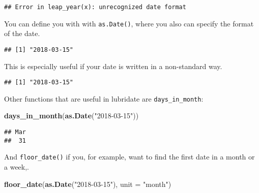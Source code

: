 \documentclass[]{book}
\newenvironment{Shaded}{\begin{snugshade}}{\end{snugshade}}
\newcommand{\DataTypeTok}[1]{\textcolor[rgb]{0.13,0.29,0.53}{#1}}
\newcommand{\KeywordTok}[1]{\textcolor[rgb]{0.13,0.29,0.53}{\textbf{#1}}}
\newcommand{\NormalTok}[1]{#1}
\newcommand{\StringTok}[1]{\textcolor[rgb]{0.31,0.60,0.02}{#1}}
\begin{document}
\begin{verbatim}
## Error in leap_year(x): unrecognized date format
\end{verbatim}

You can define you with with \texttt{as.Date()}, where you also can specify the format of the date.

\begin{Shaded}
\end{Shaded}

\begin{verbatim}
## [1] "2018-03-15"
\end{verbatim}

This is especially useful if your date is written in a non-standard way.

\begin{Shaded}
\end{Shaded}

\begin{verbatim}
## [1] "2018-03-15"
\end{verbatim}

Other functions that are useful in lubridate are \texttt{days\_in\_month}:

\begin{Shaded}
\begin{Highlighting}[]
\KeywordTok{days_in_month}\NormalTok{(}\KeywordTok{as.Date}\NormalTok{(}\StringTok{"2018-03-15"}\NormalTok{))}
\end{Highlighting}
\end{Shaded}

\begin{verbatim}
## Mar 
##  31
\end{verbatim}

And \texttt{floor\_date()} if you, for example, want to find the first date in a month or a week,.

\begin{Shaded}
\begin{Highlighting}[]
\KeywordTok{floor_date}\NormalTok{(}\KeywordTok{as.Date}\NormalTok{(}\StringTok{"2018-03-15"}\NormalTok{), }\DataTypeTok{unit =} \StringTok{"month"}\NormalTok{)}
\end{Highlighting}
\end{Shaded}
\end{document}
